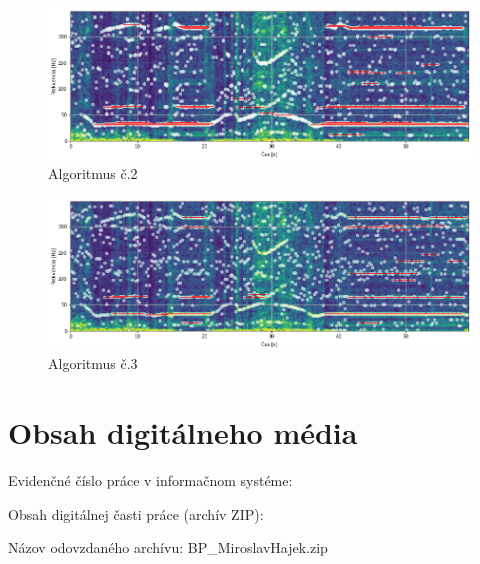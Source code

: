 \begin{figure}[h]
	\centering
    \includegraphics[width=\textwidth]{figures/verification/L35-dataset-A2.png}
    \caption{Algoritmus č.2}
\end{figure}

\begin{figure}[h]
	\centering
    \includegraphics[width=\textwidth]{figures/verification/L35-dataset-A3.png}
    \caption{Algoritmus č.3}
\end{figure}


\thispagestyle{empty}
\setcounter{figure}{0}
\chapter{Obsah digitálneho média}
\renewcommand*{\thepage}{E-\arabic{page}}
\par Evidenčné číslo práce v informačnom systéme: \RegNo
\par Obsah digitálnej časti práce (archív ZIP):
\par Názov odovzdaného archívu: BP\_MiroslavHajek.zip

